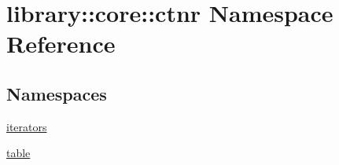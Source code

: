 \hypertarget{namespacelibrary_1_1core_1_1ctnr}{}\section{library\+::core\+::ctnr Namespace Reference}
\label{namespacelibrary_1_1core_1_1ctnr}
\subsection*{Namespaces}
\begin{DoxyCompactItemize}
\item 
 \mbox{\hyperlink{namespacelibrary_1_1core_1_1ctnr_1_1iterators}{iterators}}
\item 
 \mbox{\hyperlink{namespacelibrary_1_1core_1_1ctnr_1_1table}{table}}
\end{DoxyCompactItemize}
